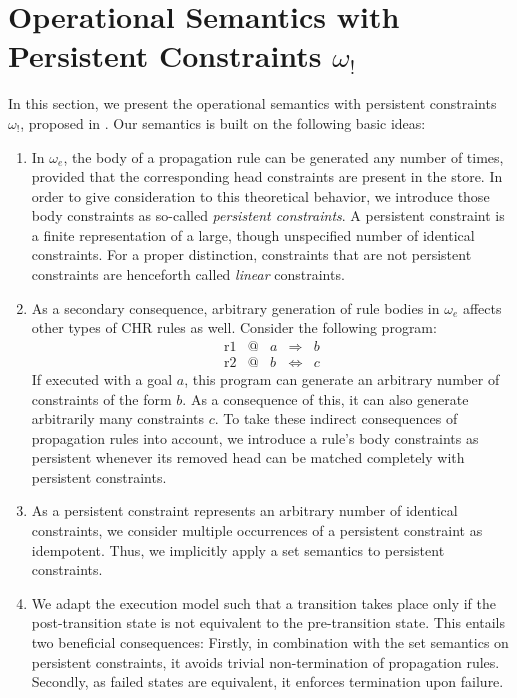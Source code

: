 \documentclass{tlp}
\newcommand{\bang}{\ensuremath{!}}
\newcommand{\obang}{\ensuremath{{\omega_\bang}}}
\newcommand{\oesq}{\ensuremath{{\omega_e}}}
\begin{document}
\section{Operational Semantics with Persistent Constraints $\obang$}
\label{sec:ouromega}

In this section, we present the operational semantics with persistent
constraints~\obang, proposed in \cite{Betz2009}. Our semantics is built on the
following basic ideas:

\begin{enumerate}
  \item In $\oesq$, the body of a
  propagation rule can be generated any number of times, provided that the corresponding head constraints are present in the
  store. In order to give consideration to this theoretical behavior, we
  introduce those body constraints as so-called \emph{persistent constraints}. A
  persistent constraint is a finite representation of a large, though unspecified
  number of identical constraints. For a proper distinction, constraints that are
  not persistent constraints are henceforth called \emph{linear} constraints.
  
  \item As a secondary consequence,
  arbitrary generation of rule bodies in $\oesq$ affects other types of CHR rules
  as well. Consider the following program:
  \[
	\begin{array}{lclcl}
	\text{r1} & @ & a & \Longrightarrow & b\\
	\text{r2} & @ & b & \Leftrightarrow & c
	\end{array}
  \]
  If executed with a goal $a$, this program can generate an arbitrary 
  number of constraints of the form $b$. As a consequence of this, it can
  also generate arbitrarily many constraints $c$. To take these indirect
  consequences of propagation rules into account, we introduce a rule's body
  constraints as persistent whenever its removed head can be matched completely
  with persistent constraints.
  
  \item As a persistent constraint represents an arbitrary number of identical
  constraints, we consider multiple occurrences of a persistent constraint as
  idempotent. Thus, we implicitly apply a set semantics to
  persistent constraints.
  
  \item We adapt the execution model such that a transition takes place only if
  the post-transition state is not equivalent to the pre-transition state. This
  entails two beneficial consequences: Firstly, in combination with the
  set semantics on persistent constraints, it avoids trivial non-termination of
  propagation rules. Secondly, as failed states are equivalent, it
  enforces termination upon failure.
\end{enumerate}
\end{document}

